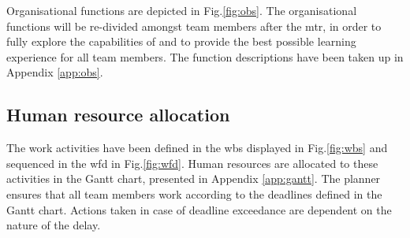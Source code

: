 Organisational functions are depicted in Fig.\ref{fig:obs}. The organisational functions will be re-divided amongst team members after the \gls{mtr}, in order to fully explore the capabilities of and to provide the best possible learning experience for all team members. The function descriptions have been taken up in Appendix \ref{app:obs}.

\subsection{Human resource allocation}
\label{sec:gantt}
The work activities have been defined in the \gls{wbs} displayed in Fig.\ref{fig:wbs} and sequenced in the \gls{wfd} in Fig.\ref{fig:wfd}. Human resources are allocated to these activities in the Gantt chart, presented in Appendix \ref{app:gantt}. The planner ensures that all team members work according to the deadlines defined in the Gantt chart. Actions taken in case of deadline exceedance are dependent on the nature of the delay.
